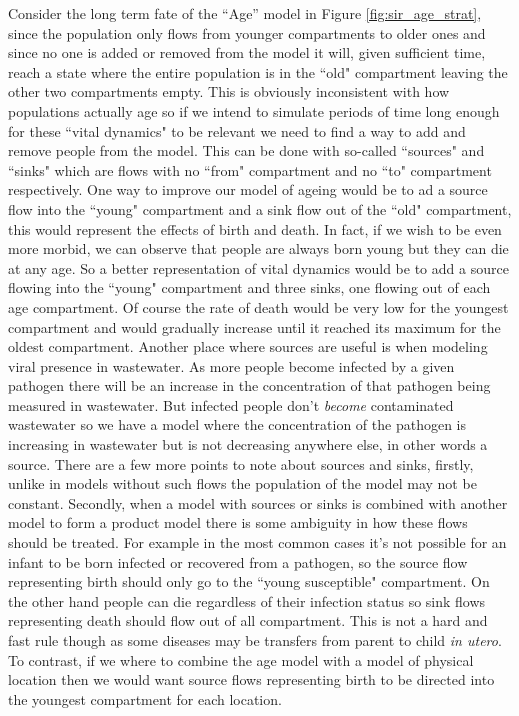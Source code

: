 Consider the long term fate of the ``Age'' model in Figure \ref{fig:sir_age_strat}, since the population only flows from younger compartments to older ones and since no one is added or removed from the model it will, given sufficient time, reach a state where the entire population is in the ``old" compartment leaving the other two compartments empty. This is obviously inconsistent with how populations actually age so if we intend to simulate periods of time long enough for these ``vital dynamics" to be relevant we need to find a way to add and remove people from the model. This can be done with so-called ``sources" and ``sinks" which are flows with no ``from" compartment and no ``to" compartment respectively. One way to improve our model of ageing would be to ad a source flow into the ``young" compartment and a sink flow out of the ``old" compartment, this would represent the effects of birth and death. In fact, if we wish to be even more morbid, we can observe that people are always born young but they can die at any age. So a better representation of vital dynamics would be to add a source flowing into the ``young" compartment and three sinks, one flowing out of each age compartment. Of course the rate of death would be very low for the youngest compartment and would gradually increase until it reached its maximum for the oldest compartment. Another place where sources are useful is when modeling viral presence in wastewater. As more people become infected by a given pathogen there will be an increase in the concentration of that pathogen being measured in wastewater.  But infected people don't \emph{become} contaminated wastewater so we have a model where the concentration of the pathogen is increasing in wastewater but is not decreasing anywhere else, in other words a source.  There are a few more points to note about sources and sinks, firstly, unlike in models without such flows the population of the model may not be constant. Secondly, when a model with sources or sinks is combined with another model to form a product model there is some ambiguity in how these flows should be treated. For example in the most common cases it's not possible for an infant to be born infected or recovered from a pathogen, so the source flow representing birth should only go to the ``young susceptible" compartment. On the other hand people can die regardless of their infection status so sink flows representing death should flow out of all compartment. This is not a hard and fast rule though as some diseases may be transfers from parent to child \emph{in utero}. To contrast, if we where to combine the age model with a model of physical location then we would want source flows representing birth to be directed into the youngest compartment for each location.

